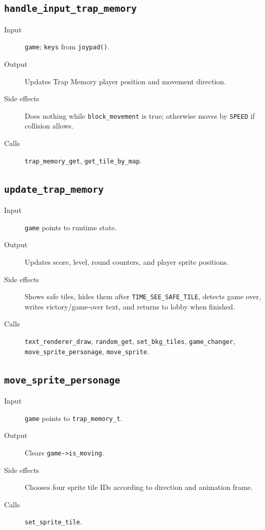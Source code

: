 \subsection*{\texttt{handle\_input\_trap\_memory}}
\begin{description}
  \item[Input] \texttt{game}; \texttt{keys} from \texttt{joypad()}.
  \item[Output] Updates Trap Memory player position and movement direction.
  \item[Side effects] Does nothing while \texttt{block\_movement} is true; otherwise moves by \texttt{SPEED} if collision allows.
  \item[Calls] \texttt{trap\_memory\_get}, \texttt{get\_tile\_by\_map}.
\end{description}

\subsection*{\texttt{update\_trap\_memory}}
\begin{description}
  \item[Input] \texttt{game} points to runtime state.
  \item[Output] Updates score, level, round counters, and player sprite positions.
  \item[Side effects] Shows safe tiles, hides them after \texttt{TIME\_SEE\_SAFE\_TILE}, detects game over, writes victory/game-over text, and returns to lobby when finished.
  \item[Calls] \texttt{text\_renderer\_draw}, \texttt{random\_get}, \texttt{set\_bkg\_tiles}, \texttt{game\_changer}, \texttt{move\_sprite\_personage}, \texttt{move\_sprite}.
\end{description}

\subsection*{\texttt{move\_sprite\_personage}}
\begin{description}
  \item[Input] \texttt{game} points to \texttt{trap\_memory\_t}.
  \item[Output] Clears \texttt{game->is\_moving}.
  \item[Side effects] Chooses four sprite tile IDs according to direction and animation frame.
  \item[Calls] \texttt{set\_sprite\_tile}.
\end{description}

